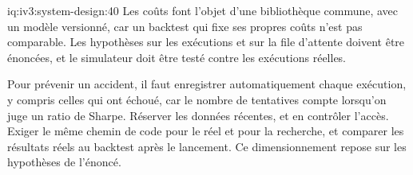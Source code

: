 \begin{solution}{iq:iv3:system-design:40}
Les coûts font l'objet d'une bibliothèque commune, avec un modèle versionné, car un backtest qui fixe ses propres coûts n'est pas comparable. Les hypothèses sur les exécutions et sur la file d'attente doivent être énoncées, et le simulateur doit être testé contre les exécutions réelles.

Pour prévenir un accident, il faut enregistrer automatiquement chaque exécution, y compris celles qui ont échoué, car le nombre de tentatives compte lorsqu'on juge un ratio de Sharpe. Réserver les données récentes, et en contrôler l'accès. Exiger le même chemin de code pour le réel et pour la recherche, et comparer les résultats réels au backtest après le lancement. Ce dimensionnement repose sur les hypothèses de l'énoncé.

\end{solution}
